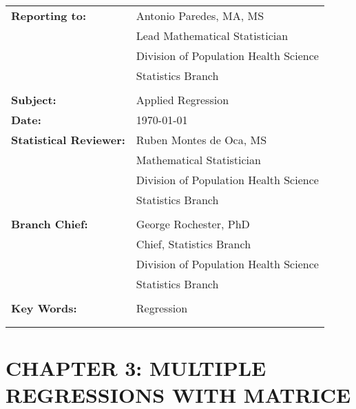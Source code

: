 \documentclass[letterpaper,11pt]{article}
\begin{document}
\begin{tabular}[h!]{p{2in} p{10in}}
	\rule{0pt}{4ex}\textbf{Reporting to:}          & Antonio Paredes, MA, MS  \\
																							   & Lead Mathematical Statistician \\
																							   & Division of Population Health Science \\
                                                 & Statistics Branch \\
																							   & \\
	\rule{0pt}{4ex}\textbf{Subject:}               & Applied Regression \\
	\rule{0pt}{4ex}\textbf{Date:}                  & \today \\
	\rule{0pt}{4ex}\textbf{Statistical Reviewer:}  & Ruben Montes de Oca, MS \\
																							   & Mathematical Statistician \\
																							   & Division of Population Health Science \\
                                                 & Statistics Branch \\
																							   & \\
	\rule{0pt}{4ex}\textbf{Branch Chief:}          & George Rochester, PhD \\
																							   & Chief, Statistics Branch \\
																							   & Division of Population Health Science \\
                                                 & Statistics Branch \\
                                                 & \\
	\rule{0pt}{4ex}\textbf{Key Words:}  					 & Regression \\
 \mbox{$\quad$} \\
 \mbox{$\quad$} \\
\end{tabular}

\newpage
\noindent 



\section*{CHAPTER 3: MULTIPLE REGRESSIONS WITH MATRICE}
\end{document}
